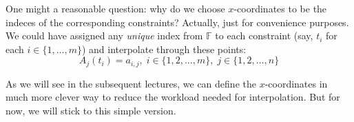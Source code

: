 \documentclass[../lecture-notes.tex]{subfiles}
\begin{document}
\begin{remark}
    One might a reasonable question: why do we choose $x$-coordinates to be the indeces of the corresponding constraints? 
    Actually, just for convenience purposes. We could have assigned any \textit{unique} index from $\mathbb{F}$ to each 
    constraint (say, $t_i$ for each $i \in \{1,\dots,m\}$) and interpolate through these points:
    \begin{equation*}
        A_j(t_i) = a_{i,j}, \; i \in \{1,2,\dots,m\}, \; j \in \{1,2,\dots,n\}
    \end{equation*}

    As we will see in the subsequent lectures, we can define the $x$-coordinates in much more clever way to reduce the workload
    needed for interpolation. But for now, we will stick to this simple version.
\end{remark}
\end{document}
